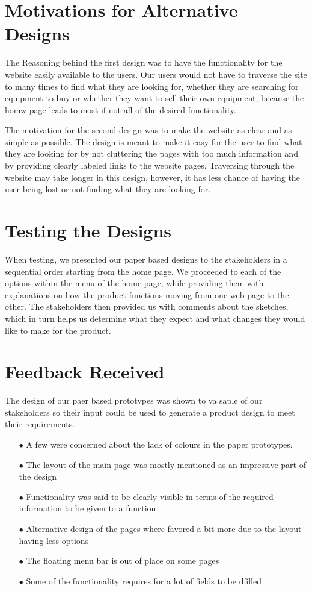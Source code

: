 \documentclass[11pt]{article}
\begin{document}
\newpage

\section{Motivations for Alternative Designs}
	The Reasoning behind the first design was to have the functionality for the website easily available to the users. Our users would not have to traverse the site to many times to find what they are looking for, whether they are searching for equipment to buy or whether they want to sell their own equipment, because the homw page leads to most if not all of the desired functionality.
	
	The motivation for the second design was to make the website as clear and as simple as possible. The design is meant to make it easy for the user to find what they are looking for by not cluttering the pages with too much information and by providing clearly labeled links to the website pages. Traversing through the website may take longer in this design, however, it has less chance of having the user being lost or not finding what they are looking for.

\section{Testing the Designs}
	When testing, we presented our paper based designs to the stakeholders in a sequential order starting from the home page. We proceeded to each of the options within the menu of the home page, while providing them with explanations on how the product functions moving from one web page to the other. The stakeholders then provided us with comments about the sketches, which in turn helps us determine what they expect and what changes they would like to make for the product.

\section{Feedback Received}
	The design of our paer based prototypes was shown to va saple of our stakeholders so their input could be used to generate a product design to meet their requirements.
	\begin{itemize}
		\item[$\bullet$] A few were concerned about the lack of colours in the paper prototypes.
		\item[$\bullet$] The layout of the main page was mostly mentioned as an impressive part of the design
		\item[$\bullet$] Functionality was said to be clearly visible in terms of the required information to be given to a function
		\item[$\bullet$] Alternative design of the pages where favored a bit more due to the layout having less options
		\item[$\bullet$] The floating menu bar is out of place on some pages
		\item[$\bullet$]  Some of the functionality requires for a lot of fields to be dfilled
	\end{itemize}
\end{document}
